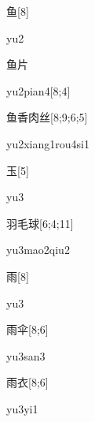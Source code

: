 \begin{verbete}[yu2]{鱼}[8]
\begin{pronuncia}{yu2}
\end{pronuncia}
\end{verbete}

\begin{verbete}[yu2pian4]{鱼片}
\begin{pronuncia}{yu2pian4}[8;4]
\end{pronuncia}
\end{verbete}

\begin{verbete}{鱼香肉丝}[8;9;6;5]
\begin{pronuncia}{yu2xiang1rou4si1}
\end{pronuncia}
\end{verbete}

\begin{verbete}[yu3]{玉}[5]
\begin{pronuncia}{yu3}
\end{pronuncia}
\end{verbete}

\begin{verbete}{羽毛球}[6;4;11]
\begin{pronuncia}{yu3mao2qiu2}
\end{pronuncia}
\end{verbete}

\begin{verbete}[yu3]{雨}[8]
\begin{pronuncia}{yu3}
\end{pronuncia}
\end{verbete}

\begin{verbete}[yu3san3]{雨伞}[8;6]
\begin{pronuncia}{yu3san3}
\end{pronuncia}
\end{verbete}

\begin{verbete}[yu3yi1]{雨衣}[8;6]
\begin{pronuncia}{yu3yi1}
\end{pronuncia}
\end{verbete}

